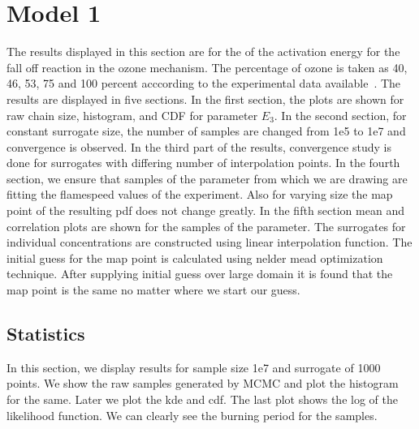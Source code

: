 \section{Model 1}

The results displayed in this section are for the
of the activation energy for the fall off reaction in the ozone
mechanism. The percentage of ozone is taken as 40, 46, 53, 75 and 100
percent acccording to the experimental data
available~\cite{Streng}. The results are displayed in five
sections. In the
first section, the plots are shown for raw chain size, histogram, and CDF
for parameter $E_3$. In the second section, for
constant surrogate size, the number of samples are changed from 1e5 to
1e7 and convergence is observed. In the third part of the results,
convergence study is done for surrogates with differing number of
interpolation points. In the
fourth section, we ensure that samples of the parameter from which we are
drawing are fitting the flamespeed values of the experiment. Also for
varying size the map point of the resulting pdf does not change
greatly. In the fifth section mean and correlation plots are shown for
the samples of the parameter. The surrogates for individual
concentrations are constructed using linear interpolation
function. The initial guess for the map point is calculated using
nelder mead optimization technique. After supplying initial guess over
large domain it is found that the map point is the same no matter
where we start our guess.

\subsection{ Statistics }

 In this section, we display results for sample size 1e7 and surrogate
 of 1000 points. We show the raw samples generated by MCMC and plot
 the histogram for the same. Later we plot the kde and cdf. The last
 plot shows the log of the likelihood function. We can clearly see the
 burning period for the samples.

